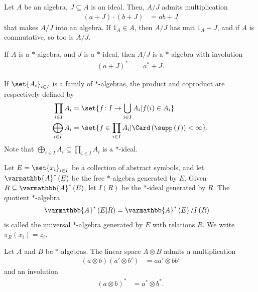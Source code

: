 \documentclass[10pt]{mypackage}
\renewcommand*{\mathbb}[1]{\varmathbb{#1}}
\newcommand{\A}{\mathbb{A}}
\begin{document}
\begin{definition}
  Let $A$ be an algebra, $J\subseteq A$ is an ideal. Then, $A/J$ admits multiplication
  \begin{align*}
    \left(a+J\right)\cdot \left(b+J\right) &= ab + J
  \end{align*}
  that makes $A/J$ into an algebra. If $1_A\in A$, then $A/J$ has unit $1_A + J$, and if $A$ is commutative, so too is $A/J$.\newline

  If $A$ is a $\ast$-algebra, and $J$ is a $\ast$-ideal, then $A/J$ is a $\ast$-algebra with involution
  \begin{align*}
    \left(a + J\right)^{\ast} &= a^{\ast} + J.
  \end{align*}
\end{definition}
\begin{definition}
  If $\set{A_i}_{i\in I}$ is a family of $\ast$-algebras, the product and coproduct are respectively defined by
  \begin{align*}
    \prod_{i\in I}A_i &= \set{f\colon I\rightarrow \bigcup_{i\in I}A_i | f(i)\in A_i}\\
    \bigoplus_{i\in I}A_i &= \set{f\in \prod_{i\in I}A_i | \Card\left(\supp\left(f\right)\right) < \infty}.
  \end{align*}
  Note that $\bigoplus_{i\in I}A_i\subseteq \prod_{i\in I}A_i$ is a $\ast$-ideal.
\end{definition}
\begin{example}
  Let $E = \set{x_i}_{i\in I}$ be a collection of abstract symbols, and let $\A^{\ast}\left(E\right)$ be the free $\ast$-algebra generated by $E$. Given $R\subseteq \A^{\ast}\left(E\right)$, let $I\left(R\right)$ be the $\ast$-ideal generated by $R$. The quotient $\ast$-algebra
  \begin{align*}
    \A^{\ast}\left(E|R\right) &= \A^{\ast}\left(E\right) / I\left(R\right)
  \end{align*}
  is called the universal $\ast$-algebra generated by $E$ with relations $R$. We write $\pi_R\left(x_i\right)= z_i$.
\end{example}
\begin{proposition}
  Let $A$ and $B$ be $\ast$-algebras. The linear space $A\otimes B$ admits a multiplication
  \begin{align*}
    \left(a\otimes b\right)\left(a'\otimes b'\right) &= aa' \otimes bb'
  \end{align*}
  and an involution
  \begin{align*}
    \left(a\otimes b\right)^{\ast} &= a^{\ast}\otimes b^{\ast}.
  \end{align*}
\end{proposition}
\end{document}

